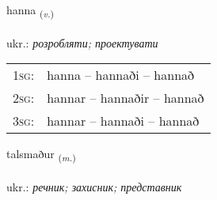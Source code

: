 \documentclass[frontgrid, backgrid]{flacards}\usepackage[]{graphicx}\usepackage[]{xcolor}
\begin{document}
\renewcommand{\flhead}{\vskip5pt \fboxsep=0pt {\small\bfseries\footnotesize Sagnorð | дієслово}}
\renewcommand{\fcfoot}{\vskip5pt \fboxsep=0pt \hspace{2pt}{\small\bfseries\footnotesize 2K}}

\renewcommand{\blhead}{\vskip5pt {\small\bfseries\footnotesize Sagnorð | дієслово }}
\renewcommand{\bcfoot}{\vskip5pt \hspace{2pt}{\small\bfseries\footnotesize 2K}}


{hanna \small{\textsubscript{(\textit{v.})}} \\[1ex] %
\textphonetic{[hana]} \\
ukr.: \emph{розробляти; проектувати} \\  [2ex]
\renewcommand*{\arraystretch}{0.8}
\begin{tabular}{p{1cm}l}
\textsc{1sg}: & hanna -- hannaði -- hannað \\ 
\textsc{2sg}: & hannar -- hannaðir -- hannað \\ 
\textsc{3sg}: & hannar -- hannaði -- hannað \\ 
\end{tabular}
}

\renewcommand{\flhead}{\vskip5pt \fboxsep=0pt {\small\bfseries\footnotesize Nafnorð | іменник}}
\renewcommand{\fcfoot}{\vskip5pt \fboxsep=0pt \hspace{2pt}{\small\bfseries\footnotesize 2K}}

\renewcommand{\blhead}{\vskip5pt {\small\bfseries\footnotesize Nafnorð | іменник }}
\renewcommand{\bcfoot}{\vskip5pt \hspace{2pt}{\small\bfseries\footnotesize 2K}}


{talsmaður \small{\textsubscript{(\textit{m.})}} \\[1ex] %
\textphonetic{[tʰalsmaðʏr]} \\
ukr.: \emph{речник; захисник; представник} \\  [2ex]
\renewcommand*{\arraystretch}{0.8}
}
\end{document}
